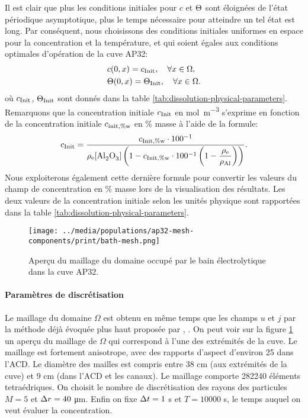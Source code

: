 Il est clair que plus les conditions initiales pour $c$ et
$\Theta$ sont éloignées de l'état périodique
asymptotique, plus le temps nécessaire pour atteindre un tel état est
long. Par conséquent, nous choisissons des conditions initiales
uniformes en espace pour la concentration et la température, et qui
soient égales aux conditions optimales d'opération de la cuve AP32:
\begin{align*}
  & c(0, x) = c_\text{Init},\quad\forall x\in\Omega,\\
  & \Theta(0, x) = \Theta_\text{Init},\quad\forall x\in\Omega.
\end{align*}
où $c_\text{Init}$, $\Theta_\text{Init}$ sont donnés dans la table
\ref{tab:dissolution-physical-parameters}. Remarquons que la
concentration initiale $c_\text{Init}$ en \si{\mol\per\cubic\meter} s'exprime
en fonction de la concentration initiale
$c_{\text{init},\%\mathrm w}$ en \% masse à l'aide de la
formule:
\begin{equation*}
  \cinit = \frac{\cinitwp \cdot
    100^{-1}}{\electrolytedensity[\cee{Al2O3}]\parent{1 - \cinitwp\cdot
      100^{-1}\parent{1 - \displaystyle\frac{\electrolytedensity}{\aluminadensity}}}}.
\end{equation*}
Nous exploiterons également cette dernière formule pour convertir les
valeurs du champ de concentration en \% masse lors de la visualisation
des résultats. Les deux valeurs de la concentration initiale selon les
unités physique sont rapportées dans la table
\ref{tab:dissolution-physical-parameters}.

\begin{figure}[t]
  \begin{center}
    \texttt{[image: ../media/populations/ap32-mesh-components/print/bath-mesh.png]}
    \caption{Aperçu du maillage du domaine occupé par le bain
      électrolytique dans la cuve AP32.}
    \label{fig:bath-mesh}
  \end{center}
\end{figure}

\paragraph{Paramètres de discrétisation}
Le maillage du domaine $\Omega$ est obtenu en même temps que les
champs $u$ et $j$ par la méthode déjà évoquée plus haut proposée par
\cite{Steiner2009}, \cite{Rochat2016}. On peut voir sur la figure
\ref{fig:bath-mesh} un aperçu du maillage de $\Omega$ qui correspond à
l'une des extrémités de la cuve. Le maillage est fortement anisotrope,
avec des rapports d'aspect d'environ \num{25} dans l'ACD. Le diamètre
des mailles est compris entre \num{38} \si{\centi\meter} (aux
extrémités de la cuve) et \num{9} \si{\centi\meter} (dans l'ACD et les
canaux). Le maillage comporte \num{282240} éléments tetraédriques. On
choisit le nombre de discrétisation des rayons des particules $M = 5$
et $\Delta r = \num{40}$ \si{\micro\meter}. Enfin on fixe $\Delta t = 1$
\si{\second} et $T = \num{10000}$ \si{\second}, le temps auquel on
veut évaluer la concentration.


